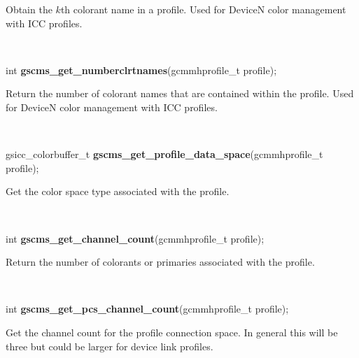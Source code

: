 \documentclass[12pt,notitlepage]{article}
\begin{document}
\begin{minipage}[h]{6.0in}
Obtain the $k$th colorant name in a profile.  Used for DeviceN color management with ICC profiles.
\end{minipage}\\

\begin{tabbing}
\noindent int {\bf gscms\_get\_numberclrtnames}(gcmmhprofile\_t profile);\\
\end{tabbing}

\begin{minipage}[h]{6.0in}
Return the number of colorant names that are contained within the profile.  Used for DeviceN color management with ICC profiles.
\end{minipage}\\

\begin{tabbing}
\noindent gsicc\_colorbuffer\_t {\bf gscms\_get\_profile\_data\_space}(gcmmhprofile\_t profile);\\
\end{tabbing}

\begin{minipage}[h]{6.0in}
Get the color space type associated with the profile.
\end{minipage}\\

\begin{tabbing}
\noindent int {\bf gscms\_get\_channel\_count}(gcmmhprofile\_t profile);\\
\end{tabbing}

\begin{minipage}[h]{6.0in}
Return the number of colorants or primaries associated with the profile.
\end{minipage}\\

\begin{tabbing}
\noindent int {\bf gscms\_get\_pcs\_channel\_count}(gcmmhprofile\_t profile);\\
\end{tabbing}

\begin{minipage}[h]{6.0in}
Get the channel count for the profile connection space.  In general this will be three but could be larger for device link profiles.
\end{minipage}\\
\end{document}
